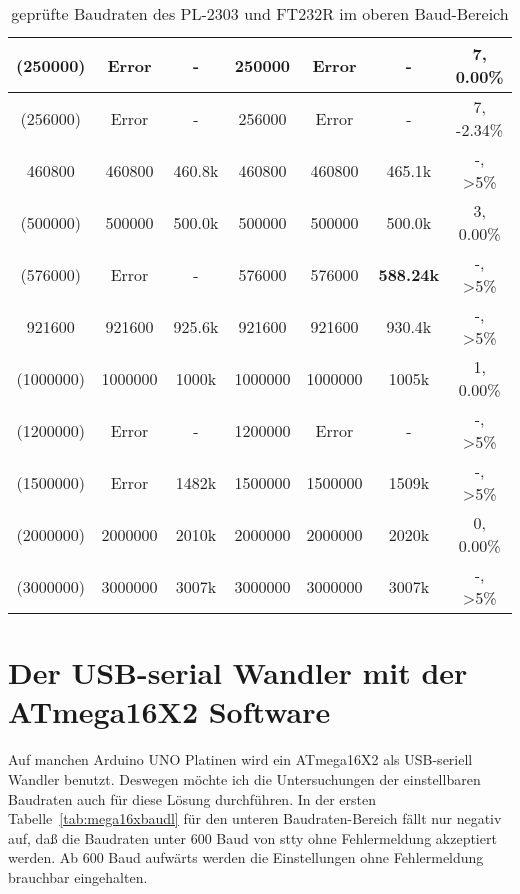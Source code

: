 \begin{table}[H]
\begin{center}
\begin{tabular}{| c | c | c || c | c | c || c |}
    \hline
    (250000) &  Error   &   -       &  250000   & Error  &    -      &   7, 0.00\%  \\
    \hline
    (256000) &  Error   &   -       &  256000   & Error  &    -      &   7, -2.34\%  \\
    \hline
     460800  &  460800  &  460.8k   &  460800   & 460800  & 465.1k   &   -, >5\%  \\
    \hline
    (500000) &  500000  &  500.0k   &  500000   & 500000 & 500.0k    &   3, 0.00\%  \\
    \hline
    (576000) &  Error  &    -       &  576000 & 576000 & \bf{588.24k} &   -, >5\%  \\
    \hline
     921600  &  921600  &  925.6k   & 921600   & 921600 &  930.4k   &   -, >5\%  \\
    \hline
   (1000000) & 1000000 &   1000k    &  1000000 & 1000000 & 1005k    &   1, 0.00\%  \\
    \hline
   (1200000)  &  Error &   -        & 1200000  & Error   &   -      &  -, >5\%  \\
    \hline
   (1500000) & Error  &    1482k    & 1500000  & 1500000 &  1509k   &  -, >5\%  \\
    \hline
   (2000000) & 2000000 &   2010k   & 2000000 & 2000000 &  2020k   & 0, 0.00\%  \\
    \hline
   (3000000) & 3000000 &   3007k   & 3000000  & 3000000 &  3007k    &  -, >5\%   \\
    \hline
    \end{tabular}
  \end{center}
  \caption{geprüfte Baudraten des PL-2303 und FT232R im oberen Baud-Bereich}
  \label{tab:PL2302baudh}
\end{table}


\section{Der USB-serial Wandler mit der ATmega16X2 Software}

Auf manchen Arduino UNO Platinen wird ein ATmega16X2 als USB-seriell Wandler benutzt.
Deswegen möchte ich die Untersuchungen der einstellbaren Baudraten auch für diese Lösung
durchführen.
In der ersten Tabelle~\ref{tab:mega16xbaudl} für den unteren Baudraten-Bereich fällt nur
negativ auf, daß die Baudraten unter 600 Baud von stty ohne Fehlermeldung akzeptiert werden.
Ab 600 Baud aufwärts werden die Einstellungen ohne Fehlermeldung brauchbar eingehalten.

